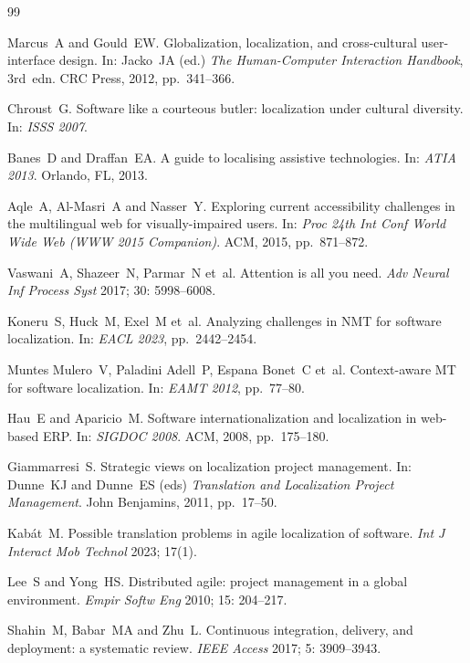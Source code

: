 \documentclass[Afour,sagev,times,doublespace]{sagej}
\begin{document}
\begin{thebibliography}{99}

Marcus~A and Gould~EW.
\newblock Globalization, localization, and cross-cultural user-interface design.
\newblock In: Jacko~JA (ed.) \emph{The Human-Computer Interaction Handbook}, 3rd~edn. CRC Press, 2012, pp.~341--366.

Chroust~G.
\newblock Software like a courteous butler: localization under cultural diversity.
\newblock In: \emph{ISSS 2007}.

Banes~D and Draffan~EA.
\newblock A guide to localising assistive technologies.
\newblock In: \emph{ATIA 2013}. Orlando, FL, 2013.

Aqle~A, Al-Masri~A and Nasser~Y.
\newblock Exploring current accessibility challenges in the multilingual web for visually-impaired users.
\newblock In: \emph{Proc 24th Int Conf World Wide Web (WWW 2015 Companion)}. ACM, 2015, pp.~871--872.

Vaswani~A, Shazeer~N, Parmar~N et~al.
\newblock Attention is all you need.
\newblock \emph{Adv Neural Inf Process Syst} 2017; 30: 5998--6008.

Koneru~S, Huck~M, Exel~M et~al.
\newblock Analyzing challenges in NMT for software localization.
\newblock In: \emph{EACL 2023}, pp.~2442--2454.

Muntes Mulero~V, Paladini Adell~P, Espana Bonet~C et~al.
\newblock Context-aware MT for software localization.
\newblock In: \emph{EAMT 2012}, pp.~77--80.

Hau~E and Aparicio~M.
\newblock Software internationalization and localization in web-based ERP.
\newblock In: \emph{SIGDOC 2008}. ACM, 2008, pp.~175--180.

Giammarresi~S.
\newblock Strategic views on localization project management.
\newblock In: Dunne~KJ and Dunne~ES (eds) \emph{Translation and Localization Project Management}. John Benjamins, 2011, pp.~17--50.

Kab\'{a}t~M.
\newblock Possible translation problems in agile localization of software.
\newblock \emph{Int J Interact Mob Technol} 2023; 17(1).

Lee~S and Yong~HS.
\newblock Distributed agile: project management in a global environment.
\newblock \emph{Empir Softw Eng} 2010; 15: 204--217.

Shahin~M, Babar~MA and Zhu~L.
\newblock Continuous integration, delivery, and deployment: a systematic review.
\newblock \emph{IEEE Access} 2017; 5: 3909--3943.


\end{thebibliography}
\end{document}
